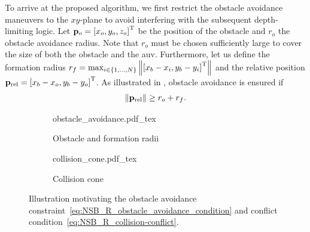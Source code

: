 To arrive at the proposed algorithm, we first restrict the obstacle avoidance maneuvers to the $xy$-plane to avoid interfering with the subsequent depth-limiting logic.
Let $\mathbf{p}_o = \left[x_o, y_o, z_o\right]^{\mathrm{T}}$ be the position of the obstacle and $r_o$ the obstacle avoidance radius.
Note that $r_o$ must be chosen sufficiently large to cover the size of both the obstacle and the \gls{auv}. %
Furthermore, let us define the formation radius
$
    r_f = \max_{i \in \{1, \ldots, N\}} \left\|\left[x_b-x_i, y_b-y_i\right]^{\mathrm{T}}\right\|
$
and the relative position $\mathbf{p}_{\rm rel} = \left[x_b - x_o, y_b - y_o\right]^{\mathrm{T}}$. As illustrated in , obstacle avoidance is ensured if 
\begin{equation}
    \left\|\mathbf{p}_{\rm rel}\right\| \geq r_o + r_f. \label{eq:NSB_R_obstacle_avoidance_condition}
\end{equation}

\begin{figure}[t]
    \centering
    \begin{subfigure}[t]{0.33\textwidth}
        \centering
        \def\svgwidth{\textwidth}
        {obstacle_avoidance.pdf_tex}
        \vspace*{-0.25em}
        \caption{Obstacle and formation radii}
        \label{fig:NSB_R_obstacle_radius}
        \vspace*{-0.25em}
    \end{subfigure}   
    \begin{subfigure}[t]{0.33\textwidth}
        \centering
        \def\svgwidth{\textwidth}
        {collision_cone.pdf_tex}
        \vspace*{-0.25em}
        \caption{Collision cone}
        \label{fig:NSB_R_collision_cone}
        \vspace*{-0.25em}
    \end{subfigure} 
    \caption{Illustration motivating the obstacle avoidance constraint~\eqref{eq:NSB_R_obstacle_avoidance_condition} and conflict condition~\eqref{eq:NSB_R_collision-conflict}.}     
    
\end{figure}



